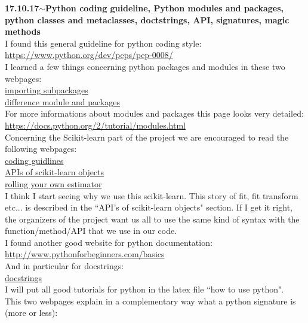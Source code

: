 \documentclass[11pt,a4paper]{article}
\newenvironment{loggentry}[2]%
{\noindent\textbf{#1}\hspace{1cm}$\mathbf{\sim}$\text{ }\textbf{#2}\\}{\vspace{0.5cm}}
\begin{document}
\begin{loggentry}{17.10.17}{Python coding guideline, Python modules and packages, python classes and metaclasses, doctstrings, API, signatures, magic methods}
I found this general guideline for python coding style:\\
\url{https://www.python.org/dev/peps/pep-0008/}\\
I learned a few things concerning python packages and modules in these two webpages:\\
\href{https://stackoverflow.com/questions/9048518/importing-packages-in-python#9049246}{importing subpackages}\\
\href{https://stackoverflow.com/questions/7948494/whats-the-difference-between-a-python-module-and-a-python-package#7948672}{difference module and packages}\\
For more informations about modules and packages this page looks very detailed:\\
\url{https://docs.python.org/2/tutorial/modules.html}\\
Concerning the Scikit-learn part of the project we are encouraged to read the following webpages:\\
\href{http://scikit-learn.org/stable/developers/contributing.html#coding-guidelines}{coding guidlines}\\
\href{http://scikit-learn.org/stable/developers/contributing.html#apis-of-scikit-learn-objects}{APIs of scikit-learn objects}\\
\href{http://scikit-learn.org/stable/developers/contributing.html#rolling-your-own-estimator}{rolling your own estimator}\\
I think I start seeing why we use this scikit-learn. This story of fit, fit transform etc... is described in the ``API's of scikit-learn objects" section. If I get it right, the organizers of the project want us all to use the same kind of syntax with the function/method/API that we use in our code.\\
I found another good website for python documentation:
\url{http://www.pythonforbeginners.com/basics}\\
And in particular for docstrings:\\
\href{http://www.pythonforbeginners.com/basics/python-docstrings/}{docstrings}\\
I will put all good tutorials for python in the latex file ``how to use python".\\
This two webpages explain in a complementary way what a python signature is (more or less):\\

\end{loggentry}
\end{document}
